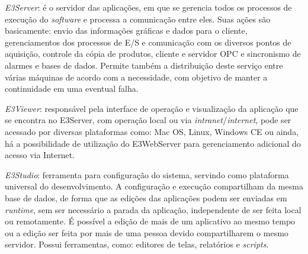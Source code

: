     \begin{alineascomponto}
    	\item \textit{E3Server}: é o servidor das aplicações, em que se gerencia todos os processos de execução do \textit{software} e processa a comunicação entre eles. Suas ações são basicamente: envio das informações gráficas e dados para o cliente, gerenciamentos dos processos de E/S e comunicação com os diversos pontos de aquisição, controle da cópia de produtos, cliente e servidor OPC e sincronismo de alarmes e bases de dados. Permite também a distribuição deste serviço entre várias máquinas de acordo com a necessidade, com objetivo de manter a continuidade em uma eventual falha.
    	\item \textit{E3Viewer}: responsável pela interface de operação e visualização da aplicação que se encontra no E3Server, com operação local ou via \textit{intranet}/\textit{internet}, pode ser acessado por diversas plataformas como: Mac OS, Linux, Windows CE ou ainda, há a possibilidade de utilização do E3WebServer para gerenciamento adicional do acesso via Internet.
    	\item \textit{E3Studio}: ferramenta para configuração do sistema, servindo como plataforma universal do desenvolvimento. A configuração e execução compartilham da mesma base de dados, de forma que as edições das aplicações podem ser enviadas em \textit{runtime}, sem ser necessário a parada da aplicação, independente de ser feita local ou remotamente. É possível a edição de mais de um aplicativo ao mesmo tempo ou a edição ser feita por mais de uma pessoa devido compartilharem o mesmo servidor. Possui ferramentas, como: editores de telas, relatórios e \textit{scripts}.
    \end{alineascomponto}
    
    \begin{figure}[!h]
    \end{figure}


